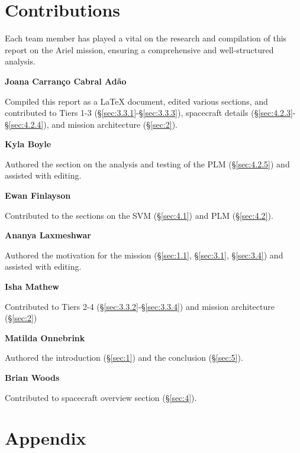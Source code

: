 \documentclass[12pt]{article}
\begin{document}
\newpage



 \label{sec:ref}

\newpage

\section*{Contributions}

Each team member has played a vital on the research and compilation of this report on the Ariel mission, ensuring a comprehensive and well-structured analysis.

\textbf{Joana Carranço Cabral Adão}

Compiled this report as a LaTeX document, edited various sections, and contributed to Tiers 1-3 (§\ref{sec:3.3.1}-§\ref{sec:3.3.3}), spacecraft details (§\ref{sec:4.2.3}-§\ref{sec:4.2.4}), and mission architecture (§\ref{sec:2}).

\textbf{Kyla Boyle}

Authored the section on the analysis and testing of the PLM (§\ref{sec:4.2.5}) and assisted with editing.

\textbf{Ewan Finlayson}

Contributed to the sections on the SVM (§\ref{sec:4.1}) and PLM (§\ref{sec:4.2}).

\textbf{Ananya Laxmeshwar}

Authored the motivation for the mission (§\ref{sec:1.1}, §\ref{sec:3.1}, §\ref{sec:3.4}) and assisted with editing.

\textbf{Isha Mathew}

Contributed to Tiers 2-4 (§\ref{sec:3.3.2}-§\ref{sec:3.3.4}) and mission architecture (§\ref{sec:2})

\textbf{Matilda Onnebrink}

Authored the introduction (§\ref{sec:1}) and the conclusion (§\ref{sec:5}).

\textbf{Brian Woods}

Contributed to spacecraft overview section (§\ref{sec:4}).

\section*{Appendix}
\end{document}
